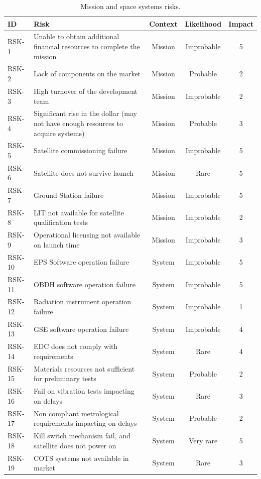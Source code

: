 \begin{table}[H]
    \centering
    \begin{tabular}{lL{0.45\textwidth}ccc}
    \toprule[1.5pt]
    \textbf{ID} & \textbf{Risk} & \textbf{Context} & \textbf{Likelihood} & \textbf{Impact} \\
    \midrule
    RSK-1 & Unable to obtain additional financial resources to complete the mission & Mission & Improbable & 5 \\
    RSK-2 & Lack of components on the market & Mission & Probable & 2 \\
    RSK-3 & High turnover of the development team & Mission  & Improbable & 2 \\
    RSK-4 & Significant rise in the dollar (may not have enough resources to acquire systems) & Mission & Probable & 3 \\
    RSK-5 & Satellite commissioning failure & Mission & Improbable & 5 \\
    RSK-6 & Satellite does not survive launch & Mission & Rare & 5 \\
    RSK-7 & Ground Station failure & Mission & Improbable & 5 \\
    RSK-8 & LIT not available for satellite qualification tests & Mission  & Improbable & 2 \\
    RSK-9 & Operational licensing not available on launch time & Mission  & Improbable & 3 \\
    RSK-10 & EPS Software operation failure & System & Improbable & 5 \\
    RSK-11 & OBDH software operation failure & System & Improbable & 5 \\
    RSK-12 & Radiation instrument operation failure & System  & Improbable & 1 \\
    RSK-13 & GSE software operation failure & System  & Improbable & 4 \\
    RSK-14 & EDC does not comply with requirements & System & Rare & 4  \\
    RSK-15 & Materials resources not sufficient for preliminary tests & System & Probable & 2 \\
    RSK-16 & Fail on vibration tests impacting on delays & System  & Rare & 3 \\
    RSK-17 & Non compliant metrological requirements impacting on delays & System & Probable & 2 \\
    RSK-18 & Kill switch mechanism fail, and satellite does not power on & System & Very rare & 5 \\
    RSK-19 & COTS systems not available in market & System & Rare & 3 \\
    \bottomrule[1.5pt]
    \end{tabular}
    \caption{Mission and space systems risks.}
    \label{risk_ID}
\end{table}